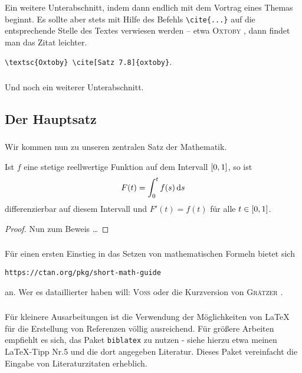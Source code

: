 %
\subsubsection{} 
Ein weitere Unterabschnitt, indem dann endlich mit dem Vortrag eines Themas beginnt. 
Es sollte aber stets mit Hilfe des Befehls \verb|\cite{...}| auf die entsprechende Stelle des Textes verwiesen werden -- etwa \textsc{Oxtoby} \cite[Satz 7.8]{oxtoby}, dann findet man das Zitat leichter. 
%
\begin{center}
\verb|\textsc{Oxtoby} \cite[Satz 7.8]{oxtoby}|.
\end{center}
%
\subsubsection{} 
%
Und noch ein weiterer Unterabschnitt.
%
\subsection{Der Hauptsatz}
\subsubsection{}
Wir kommen nun zu unseren zentralen Satz der Mathematik.
%
\begin{theorem}\label{thm:hauptsatz}
%	
Ist $ f $ eine stetige reellwertige Funktion auf dem Intervall\/ $ \left[ 0,1 \right] $, so ist
%
\[
  	F( t ) = \int_{ 0 }^{ t } f(s) \mathop{}\!\mathrm{d}{s}
\]
%
differenzierbar auf diesem Intervall und $ F'(t) = f(t) $ für alle $ t \in  \left[ 0,1 \right] $.
\end{theorem}
%
\begin{proof}
Nun zum Beweis \ldots 
\end{proof}
%
\subsubsection{}
Für einen ersten Einstieg in das Setzen von mathematischen Formeln bietet sich 
\begin{center}
\texttt{https://ctan.org/pkg/short-math-guide}
\end{center}
an.
Wer es dataillierter haben will: \textsc{Voss} \cite{voss-math} oder die Kurzversion von \textsc{Grätzer} \cite{graetzer-ma}.

\subsubsection{}
Für kleinere Ausarbeitungen ist die Verwendung der Möglichkeiten von \LaTeX{} für die Erstellung von Referenzen völlig ausreichend.
Für größere Arbeiten empfiehlt es sich, das Paket \texttt{biblatex} zu nutzen - siehe hierzu etwa meinen \LaTeX{}-Tipp Nr.5 und die dort angegeben Literatur.
Dieses Paket vereinfacht die Eingabe von Literaturzitaten erheblich.
 

